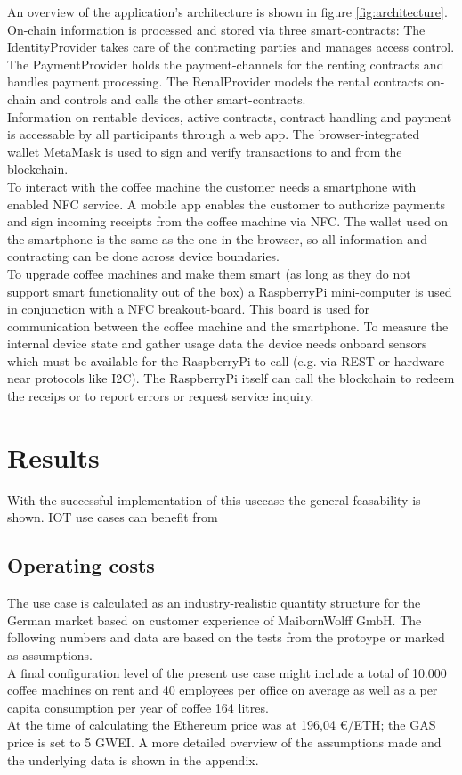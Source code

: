 \documentclass[conference]{IEEEtran}
\begin{document}
An overview of the application's architecture is shown in figure \ref{fig:architecture}. On-chain information is processed and stored via three smart-contracts: The IdentityProvider takes care of the contracting parties and manages access control. The PaymentProvider holds the payment-channels for the renting contracts and handles payment processing. The RenalProvider models the rental contracts on-chain and controls and calls the other smart-contracts.\\
Information on rentable devices, active contracts, contract handling and payment is accessable by all participants through a web app. The browser-integrated wallet MetaMask is used to sign and verify transactions to and from the blockchain.\\
To interact with the coffee machine the customer needs a smartphone with enabled NFC service. A mobile app enables the customer to authorize payments and sign incoming receipts from the coffee machine via NFC. The wallet used on the smartphone is the same as the one in the browser, so all information and contracting can be done across device boundaries.\\
To upgrade coffee machines and make them smart (as long as they do not support smart functionality out of the box) a RaspberryPi mini-computer is used in conjunction with a NFC breakout-board. This board is used for communication between the coffee machine and the smartphone. To measure the internal device state and gather usage data the device needs onboard sensors which must be available for the RaspberryPi to call (e.g. via REST or hardware-near protocols like I2C). The RaspberryPi itself can call the blockchain to redeem the receips or to report errors or request service inquiry.\\



\section{Results}
\textit{\lipsum[1-1]}
With the successful implementation of this usecase the general feasability is shown. IOT use cases can benefit from 

\subsection{Operating costs}
The use case is calculated as an industry-realistic quantity structure for the German market based on customer experience of MaibornWolff GmbH. The following numbers and data are based on the tests from the protoype or marked as assumptions.\\
A final configuration level of the present use case might include a total of 10.000 coffee machines on rent and 40 employees per office on average as well as a per capita consumption per year of coffee 164 litres.\\
At the time of calculating the Ethereum price was at 196,04 €/ETH; the GAS price is set to 5 GWEI. A more detailed overview of the assumptions made and the underlying data is shown in the appendix.\\
\end{document}
